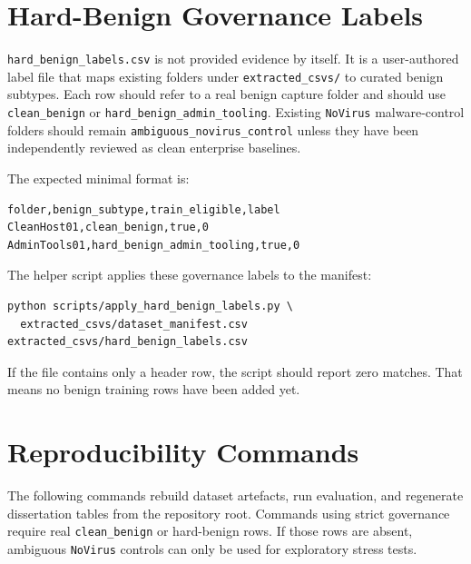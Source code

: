 \section{Hard-Benign Governance Labels}

\texttt{hard\_benign\_labels.csv} is not provided evidence by itself. It is a user-authored label file that maps existing folders under \texttt{extracted\_csvs/} to curated benign subtypes. Each row should refer to a real benign capture folder and should use \texttt{clean\_benign} or \texttt{hard\_benign\_admin\_tooling}. Existing \texttt{NoVirus} malware-control folders should remain \texttt{ambiguous\_novirus\_control} unless they have been independently reviewed as clean enterprise baselines.

The expected minimal format is:

\begin{verbatim}
folder,benign_subtype,train_eligible,label
CleanHost01,clean_benign,true,0
AdminTools01,hard_benign_admin_tooling,true,0
\end{verbatim}

The helper script applies these governance labels to the manifest:

\begin{verbatim}
python scripts/apply_hard_benign_labels.py \
  extracted_csvs/dataset_manifest.csv extracted_csvs/hard_benign_labels.csv
\end{verbatim}

If the file contains only a header row, the script should report zero matches. That means no benign training rows have been added yet.

\section{Reproducibility Commands}
The following commands rebuild dataset artefacts, run evaluation, and regenerate dissertation tables from the repository root. Commands using strict governance require real \texttt{clean\_benign} or hard-benign rows. If those rows are absent, ambiguous \texttt{NoVirus} controls can only be used for exploratory stress tests.

